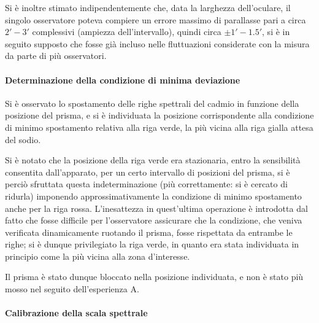 \documentclass[a4paper,10pt]{article}
\begin{document}
Si è inoltre stimato indipendentemente che, data la larghezza dell'oculare, il singolo osservatore poteva compiere un errore massimo di parallasse pari a circa $2'-3'$ complessivi (ampiezza dell'intervallo), quindi circa $\pm 1'-1.5'$, si è in seguito supposto che fosse già incluso nelle fluttuazioni considerate con la misura da parte di più osservatori.

\paragraph{Determinazione della condizione di minima deviazione} Si è osservato lo spostamento delle righe spettrali del cadmio in funzione della posizione del prisma, e si è individuata la posizione corrispondente alla condizione di minimo spostamento relativa alla riga verde, la più vicina alla riga gialla attesa del sodio.

Si è notato che la posizione della riga verde era stazionaria, entro la sensibilità consentita dall'apparato, per un certo intervallo di posizioni del prisma, si è perciò sfruttata questa indeterminazione (più correttamente: si è cercato di ridurla) imponendo approssimativamente la condizione di minimo spostamento anche per la riga rossa.
L'inesattezza in quest'ultima operazione è introdotta dal fatto che fosse difficile per l'osservatore assicurare che la condizione, che veniva verificata dinamicamente ruotando il prisma, fosse rispettata da entrambe le righe; si è dunque privilegiato la riga verde, in quanto era stata individuata in principio come la più vicina alla zona d'interesse.

Il prisma è stato dunque bloccato nella posizione individuata, e non è stato più mosso nel seguito dell'esperienza A.

\paragraph{Calibrazione della scala spettrale} 
\end{document}
